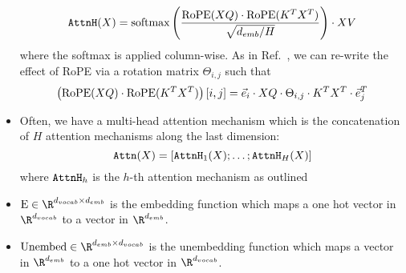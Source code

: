 \begin{itemize}
\[			\texttt{AttnH}(X) = \text{softmax}\left( \frac{\operatorname{RoPE}(X Q) \cdot \operatorname{RoPE}(K^T X^T)}{\sqrt{{d_{emb}} / H}} \right) \cdot X V
		\]
		where the softmax is applied column-wise.
        As in Ref.~\cite{black2022gptneox20bopensourceautoregressivelanguage}, we can re-write the effect of RoPE via a rotation matrix $\Theta_{i, j}$ such that
        \[
            \left(\operatorname{RoPE}(X Q) \cdot \operatorname{RoPE}(K^T X^T)\right)[i, j] = \vec{e}_i \cdot X Q \cdot \Theta_{i, j} \cdot  K^T  X^T \cdot \vec{e}_j^T
        \]
	\item Often, we have a multi-head attention mechanism which is the concatenation of $H$ attention mechanisms along the last dimension:
		\[
			\texttt{Attn}(X) = [\texttt{AttnH}_1(X); \ldots; \texttt{AttnH}_H(X)]
		\]
		where $\texttt{AttnH}_h$ is the $h$-th attention mechanism as outlined
	\item $\Embed \in \R^{\dVocab \times \dEmb}$ is the embedding function which maps a one hot vector in $\R^\dVocab$ to a vector in $\R^{\dEmb}$.
	\item $\Unembed \in \R^{\dEmb \times \dVocab}$ is the unembedding function which maps a vector in $\R^{\dEmb}$ to a one hot vector in $\R^\dVocab$.
\end{itemize}


